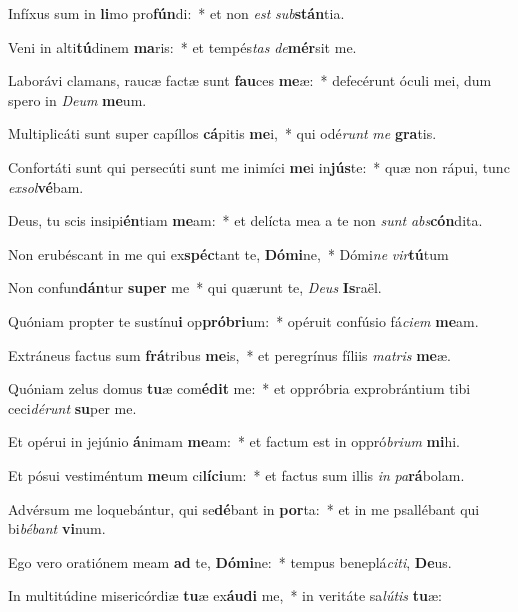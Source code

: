 \item Infíxus sum in \textbf{li}mo pro\textbf{fún}di:~* et non \textit{est} \textit{sub}\textbf{stán}tia.
\item Veni in alti\textbf{tú}dinem \textbf{ma}ris:~* et tempés\textit{tas} \textit{de}\textbf{mér}sit me.
\item Laborávi clamans, raucæ factæ sunt \textbf{fau}ces \textbf{me}æ:~* defecérunt óculi mei, dum spero in \textit{De}\textit{um} \textbf{me}um.
\item Multiplicáti sunt super capíllos \textbf{cá}pitis \textbf{me}i,~* qui odé\textit{runt} \textit{me} \textbf{gra}tis.
\item Confortáti sunt qui persecúti sunt me inimíci \textbf{me}i in\textbf{jús}te:~* quæ non rápui, tunc \textit{ex}\textit{sol}\textbf{vé}bam.
\item Deus, tu scis insipi\textbf{én}tiam \textbf{me}am:~* et delícta mea a te non \textit{sunt} \textit{abs}\textbf{cón}dita.
\item Non erubéscant in me qui ex\textbf{spéc}tant te, \textbf{Dó}\textbf{mi}ne,~* Dómi\textit{ne} \textit{vir}\textbf{tú}tum
\item Non confun\textbf{dán}tur \textbf{su}\textbf{per} me~* qui quærunt te, \textit{De}\textit{us} \textbf{Is}raël.
\item Quóniam propter te sustínu\textbf{i} op\textbf{pró}\textbf{bri}um:~* opéruit confúsio fá\textit{ci}\textit{em} \textbf{me}am.
\item Extráneus factus sum \textbf{frá}tribus \textbf{me}is,~* et peregrínus fíliis \textit{ma}\textit{tris} \textbf{me}æ.
\item Quóniam zelus domus \textbf{tu}æ com\textbf{é}\textbf{dit} me:~* et oppróbria exprobrántium tibi ceci\textit{dé}\textit{runt} \textbf{su}per me.
\item Et opérui in jejúnio \textbf{á}nimam \textbf{me}am:~* et factum est in oppró\textit{bri}\textit{um} \textbf{mi}hi.
\item Et pósui vestiméntum \textbf{me}um ci\textbf{lí}\textbf{ci}um:~* et factus sum illis \textit{in} \textit{pa}\textbf{rá}bolam.
\item Advérsum me loquebántur, qui se\textbf{dé}bant in \textbf{por}ta:~* et in me psallébant qui bi\textit{bé}\textit{bant} \textbf{vi}num.
\item Ego vero oratiónem meam \textbf{ad} te, \textbf{Dó}\textbf{mi}ne:~* tempus beneplá\textit{ci}\textit{ti}, \textbf{De}us.
\item In multitúdine misericórdiæ \textbf{tu}æ ex\textbf{áu}\textbf{di} me,~* in veritáte sa\textit{lú}\textit{tis} \textbf{tu}æ:
